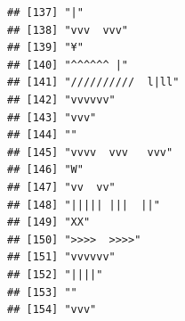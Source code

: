 \documentclass[
]{article}
\begin{document}
\begin{verbatim}
## [137] "|"                                                                                                                                        
## [138] "vvv  vvv"                                                                                                                                 
## [139] "¥"                                                                                                                                        
## [140] "^^^^^^ |"                                                                                                                                 
## [141] "//////////  l|ll"                                                                                                                         
## [142] "vvvvvv"                                                                                                                                   
## [143] "vvv"                                                                                                                                      
## [144] ""                                                                                                                                         
## [145] "vvvv  vvv   vvv"                                                                                                                          
## [146] "W"                                                                                                                                        
## [147] "vv  vv"                                                                                                                                   
## [148] "||||| |||  ||"                                                                                                                            
## [149] "XX"                                                                                                                                       
## [150] ">>>>  >>>>"                                                                                                                               
## [151] "vvvvvv"                                                                                                                                   
## [152] "||||"                                                                                                                                     
## [153] ""                                                                                                                                         
## [154] "vvv"                                                                                                                                      

\end{verbatim}
\end{document}

